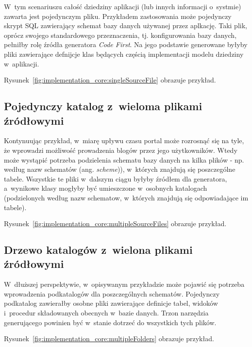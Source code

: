 W~tym scenariuszu całość dziedziny aplikacji (lub innych informacji o~systmie) zawarta jest pojedynczym pliku.
Przykładem zastosowania może pojedynczy skrypt SQL zawierający schemat bazy danych używanej przez aplkację.
Taki plik, oprócz swojego standardowego przeznaczenia, tj. konfigurowania bazy danych, pełniłby rolę źródła generatora \emph{Code First}.
Na jego podstawie generowane byłyby pliki zawierające defnijcje klas będących częścią implementacji modelu dziedziny w~aplikacji.

Rysunek~\ref{fig:implementation_core:singleSourceFile} obrazuje przykład.




\subsection{Pojedynczy katalog z~wieloma plikami źródłowymi}

Kontynuując przykład, w~miarę upływu czasu portal może rozrosnąć się na tyle, że wprowadzi możliwość prowadzenia blogów przez jego użytkowników.
Wtedy może wystąpić potrzeba podzielenia schematu bazy danych na kilka plików - np. według nazw schematów (ang. \emph{scheme})), w~których znajdują się poszczególne tabele.
Wszystkie te pliki w~dalszym ciągu byłyby źródłem dla generatora, a~wynikowe klasy mogłyby być umieszczone w~osobnych katalogach (podzielonych według nazw schematow, w~których znajdują się odpowiadające im tabele).

Rysunek~\ref{fig:implementation_core:multipleSourceFiles} obrazuje przykład.




\subsection{Drzewo katalogów z~wielona plikami źródłowymi}

W~dłuższej perspektywie, w~opisywanym przykładzie może pojawić się potrzeba wprowadzenia podkatalogów dla poszczególnych schematów.
Pojedynczy podkatalog zawierałby osobne pliki zawierające definicje tabel, widoków i~procedur składowanych obecnych w~bazie danych.
Trzon narzędzia generującego powinien być w~stanie dotrzeć do wszystkich tych plików.

Rysunek~\ref{fig:implementation_core:multipleFolders} obrazuje przykład.



